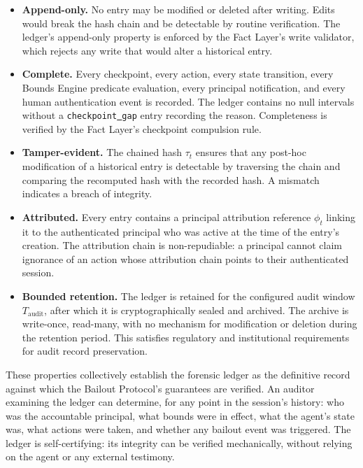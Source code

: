 \begin{itemize}
    \item \textbf{Append-only.} No entry may be modified or deleted after writing. Edits would break the hash chain and be detectable by routine verification. The ledger's append-only property is enforced by the Fact Layer's write validator, which rejects any write that would alter a historical entry.
    \item \textbf{Complete.} Every checkpoint, every action, every state transition, every Bounds Engine predicate evaluation, every principal notification, and every human authentication event is recorded. The ledger contains no null intervals without a \texttt{checkpoint\underline{ }gap} entry recording the reason. Completeness is verified by the Fact Layer's checkpoint compulsion rule.
    \item \textbf{Tamper-evident.} The chained hash $\tau_t$ ensures that any post-hoc modification of a historical entry is detectable by traversing the chain and comparing the recomputed hash with the recorded hash. A mismatch indicates a breach of integrity.
    \item \textbf{Attributed.} Every entry contains a principal attribution reference $\phi_t$ linking it to the authenticated principal who was active at the time of the entry's creation. The attribution chain is non-repudiable: a principal cannot claim ignorance of an action whose attribution chain points to their authenticated session.
    \item \textbf{Bounded retention.} The ledger is retained for the configured audit window $T_{\text{audit}}$, after which it is cryptographically sealed and archived. The archive is write-once, read-many, with no mechanism for modification or deletion during the retention period. This satisfies regulatory and institutional requirements for audit record preservation.
\end{itemize}

These properties collectively establish the forensic ledger as the definitive record against which the Bailout Protocol's guarantees are verified. An auditor examining the ledger can determine, for any point in the session's history: who was the accountable principal, what bounds were in effect, what the agent's state was, what actions were taken, and whether any bailout event was triggered. The ledger is self-certifying: its integrity can be verified mechanically, without relying on the agent or any external testimony.
